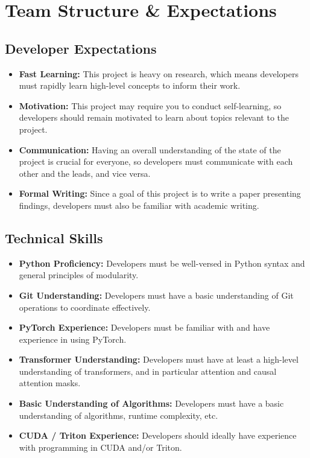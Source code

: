 \documentclass{article}
\begin{document}


\section{Team Structure \& Expectations} 

\subsection{Developer Expectations} %

\begin{itemize}
    \item \textbf{Fast Learning:} This project is heavy on research, which means developers must rapidly learn high-level concepts to inform their work.
    \item \textbf{Motivation:} This project may require you to conduct self-learning, so developers should remain motivated to learn about topics relevant to the project.
    \item \textbf{Communication:} Having an overall understanding of the state of the project is crucial for everyone, so developers must communicate with each other and the leads, and vice versa.
    \item \textbf{Formal Writing:} Since a goal of this project is to write a paper presenting findings, developers must also be familiar with academic writing.
\end{itemize}

\subsection{Technical Skills} %

\begin{itemize}
    \item \textbf{Python Proficiency:} Developers must be well-versed in Python syntax and general principles of modularity.
    \item \textbf{Git Understanding:} Developers must have a basic understanding of Git operations to coordinate effectively.
    \item \textbf{PyTorch Experience:} Developers must be familiar with and have experience in using PyTorch.
    \item \textbf{Transformer Understanding:} Developers must have at least a high-level understanding of transformers, and in particular attention and causal attention masks.
    \item \textbf{Basic Understanding of Algorithms:} Developers must have a basic understanding of algorithms, runtime complexity, etc.
    \item \textbf{CUDA / Triton Experience:} Developers should ideally have experience with programming in CUDA and/or Triton.
\end{itemize}
\end{document}
